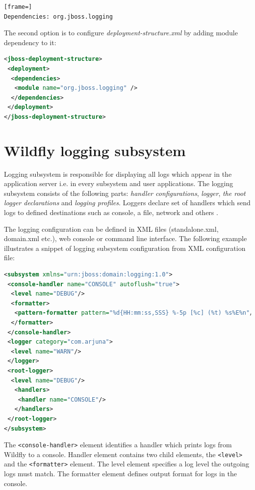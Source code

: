 \documentclass[12pt,oneside]{fithesis2}
\begin{document}
\begin{lstlisting}[frame=]
Dependencies: org.jboss.logging
\end{lstlisting}

\newpage
The second option is to configure \textit{deployment-structure.xml} by adding module dependency to it:

\begin{lstlisting}[caption = Configuring deployment structure file \cite{wildfly_book}, label = dynamic_module_descriptor, language=XML]
<jboss-deployment-structure>
 <deployment>
  <dependencies>
   <module name="org.jboss.logging" />
  </dependencies>
 </deployment>
</jboss-deployment-structure>
\end{lstlisting}

\section{Wildfly logging subsystem}
\label{wildfly_logging}
Logging subsystem is responsible for displaying all logs which appear in the application server i.e. in every subsystem and user applications. The logging subsystem consists of the following parts: \textit{handler configurations}, \textit{logger}, \textit{the root logger declarations} and \textit{logging profiles}. Loggers declare set of handlers which send logs to defined destinations such as console, a file, network and others \cite[Logging Configuration]{wildfly_doc}.

The logging configuration can be defined in XML files (standalone.xml, domain.xml etc.), web console or command line interface. The following example illustrates a snippet of logging subsystem configuration from XML configuration file:

\begin{lstlisting}[caption = Configuring logging subsystem, label = logging_subsystem, language=XML]
<subsystem xmlns="urn:jboss:domain:logging:1.0">
 <console-handler name="CONSOLE" autoflush="true">
  <level name="DEBUG"/>
  <formatter>
   <pattern-formatter pattern="%d{HH:mm:ss,SSS} %-5p [%c] (%t) %s%E%n"/>
  </formatter>
 </console-handler>
 <logger category="com.arjuna">
  <level name="WARN"/>
 </logger>
 <root-logger>
  <level name="DEBUG"/>
   <handlers>
    <handler name="CONSOLE"/>
   </handlers>
 </root-logger>
</subsystem>
\end{lstlisting}
\noindent
The \verb|<console-handler>| element identifies a handler which prints logs from Wildfly to a console. Handler element contains two child elements, the \verb|<level>| and the \verb|<formatter>| element. The level element specifies a log level the outgoing logs must match. The formatter element defines output format for logs in the console.
\end{document}
